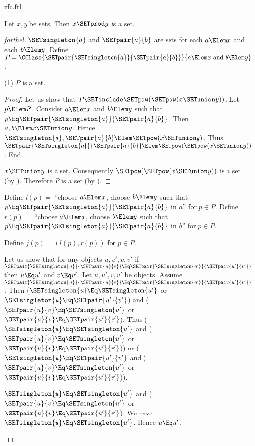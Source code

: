 \documentclass{stex}
\begin{document}
\begin{smodule}{zfc.ftl}
\begin{proposition}[forthel]
  Let $x, y$ be sets.
  Then $x \SETprod y$ is a set.
\end{proposition}
\begin{proof}[forthel]
  $\SETsingleton{a}$ and $\SETpair{a}{b}$ are sets for each $a \Elem x$ and each $b \Elem y$.
  Define $P = \CClass{\SETpair{\SETsingleton{a}}{\SETpair{a}{b}}}{a \Elem x\text{ and }b \Elem y}$.

  (1) $P$ is a set.
  \begin{proof}
    Let us show that $P \SETinclude \SETpow(\SETpow(x \SETunion y))$.
      Let $p \Elem P$.
      Consider $a \Elem x$ and $b \Elem y$ such that $p \Eq \SETpair{\SETsingleton{a}}{\SETpair{a}{b}}$.
      Then $a, b \Elem x \SETunion y$.
      Hence $\SETsingleton{a}, \SETpair{a}{b} \Elem \SETpow(x \SETunion y)$.
      Thus $\SETpair{\SETsingleton{a}}{\SETpair{a}{b}} \Elem \SETpow(\SETpow(x \SETunion y))$.
    End.

    $x \SETunion y$ is a set.
    Consequently $\SETpow(\SETpow(x \SETunion y))$ is a set (by ).
    Therefore $P$ is a set (by ).
  \end{proof}

  Define $l(p) =$ ``choose $a \Elem x$, choose $b \Elem y$ such that $p \Eq \SETpair{\SETsingleton{a}}{\SETpair{a}{b}}$ in $a$'' for $p \in P$.
  Define $r(p) =$ ``choose $a \Elem x$, choose $b \Elem y$ such that $p \Eq \SETpair{\SETsingleton{a}}{\SETpair{a}{b}}$ in $b$'' for $p \in P$.

  Define $f(p) = (l(p), r(p))$ for $p \in P$.

  Let us show that for any objects $u, u', v, v'$ if
  $\SETpair{\SETsingleton{u}}{\SETpair{u}{v}} \Eq \SETpair{\SETsingleton{u'}}{\SETpair{u'}{v'}}$ then $u \Eq u'$ and $v \Eq v'$.
    Let $u, u', v, v'$ be objects.
    Assume $\SETpair{\SETsingleton{u}}{\SETpair{u}{v}} \Eq \SETpair{\SETsingleton{u'}}{\SETpair{u'}{v'}}$.
    Then ($\SETsingleton{u} \Eq \SETsingleton{u'}$ or $\SETsingleton{u} \Eq \SETpair{u'}{v'}$) and ($\SETpair{u}{v} \Eq \SETsingleton{u'}$ or $\SETpair{u}{v} \Eq \SETpair{u'}{v'}$).
    Thus ($\SETsingleton{u} \Eq \SETsingleton{u'}$ and ($\SETpair{u}{v} \Eq \SETsingleton{u'}$ or $\SETpair{u}{v} \Eq \SETpair{u'}{v'}$)) or ($\SETsingleton{u} \Eq \SETpair{u'}{v'}$ and ($\SETpair{u}{v} \Eq \SETsingleton{u'}$ or $\SETpair{u}{v} \Eq \SETpair{u'}{v'}$)).

    \begin{case}{$\SETsingleton{u} \Eq \SETsingleton{u'}$ and ($\SETpair{u}{v} \Eq \SETsingleton{u'}$ or $\SETpair{u}{v} \Eq \SETpair{u'}{v'}$).}
      We have $\SETsingleton{u} \Eq \SETsingleton{u'}$.
      Hence $u \Eq u'$.


\end{case}
\end{proof}
\end{smodule}
\end{document}
